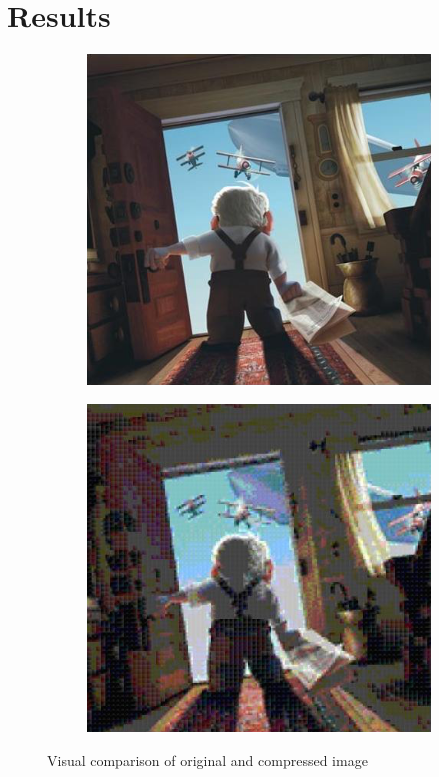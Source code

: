 \section{Results}

\begin{figure}
\begin{subfigure}[b]{0.49\linewidth}
\includegraphics[width=1.0\linewidth]{images/original_2}
\end{subfigure}
\begin{subfigure}[b]{0.49\linewidth}
\includegraphics[width=1.0\linewidth]{images/reconstructed_2}
\end{subfigure}
\caption{Visual comparison of original and compressed image}
\label{fig:compare_images}
\end{figure}

